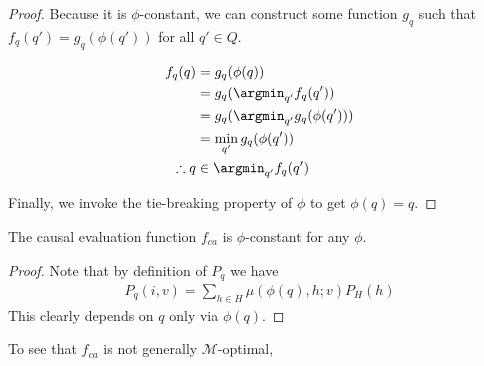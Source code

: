 \begin{proof}
Because it is $\phi$-constant, we can construct some function $g_q$ such that $f_q(q')=g_q(\phi(q'))$ for all $q'\in Q$.

\begin{align}
    f_q(q)       &= g_q(\phi(q))\\
                 &= g_q(\argmin_{q'} f_q(q'))\\
                 &= g_q(\argmin_{q'} g_q(\phi(q')))\\
                 &= \min_{q'} g_q(\phi(q'))\\
    \therefore  q&\in \argmin_{q'} f_q(q') 
\end{align}

Finally, we invoke the tie-breaking property of $\phi$ to get $\phi(q)=q$.
\end{proof}

\begin{lemma}
The causal evaluation function $f_{ca}$ is $\phi$-constant for any $\phi$.
\end{lemma}

\begin{proof}
Note that by definition of $P_q$ we have
\begin{align}
    P_q(i,v) = \sum_{h\in H}\mu(\phi(q),h;v)P_H(h)
\end{align}
This clearly depends on $q$ only via $\phi(q)$.
\end{proof}


To see that $f_{ca}$ is not generally $\mathscr{M}$-optimal, 